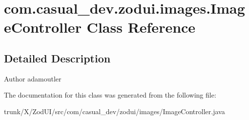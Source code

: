 \hypertarget{classcom_1_1casual__dev_1_1zodui_1_1images_1_1_image_controller}{\section{com.\-casual\-\_\-dev.\-zodui.\-images.\-Image\-Controller Class Reference}
\label{classcom_1_1casual__dev_1_1zodui_1_1images_1_1_image_controller}
}


\subsection{Detailed Description}
\begin{DoxyAuthor}{Author}
adamoutler 
\end{DoxyAuthor}


The documentation for this class was generated from the following file\-:\begin{DoxyCompactItemize}
\item 
trunk/\-X/\-Zod\-U\-I/src/com/casual\-\_\-dev/zodui/images/Image\-Controller.\-java\end{DoxyCompactItemize}
